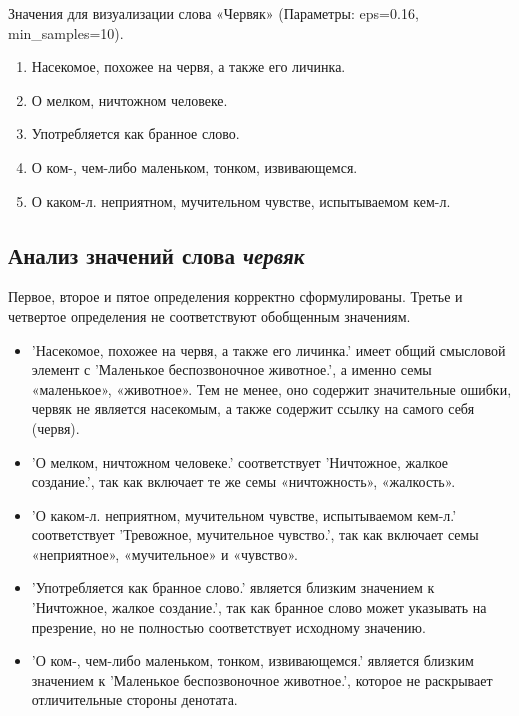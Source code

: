 Значения для визуализации слова «Червяк» (Параметры: eps=0.16, min\_samples=10).

\begin{enumerate}
    \item Насекомое, похожее на червя, а также его личинка.
    \item О мелком, ничтожном человеке.
    \item Употребляется как бранное слово.
    \item О ком-, чем-либо маленьком, тонком, извивающемся.
    \item О каком-л. неприятном, мучительном чувстве, испытываемом кем-л.
\end{enumerate}

\subsection*{Анализ значений слова \textit{червяк}}

Первое, второе и пятое определения корректно сформулированы.
Третье и четвертое определения не соответствуют обобщенным значениям.

\begin{itemize}
    \item ’Насекомое, похожее на червя, а также его личинка.’ имеет общий смысловой элемент с
’Маленькое беспозвоночное животное.’, а именно семы «маленькое», «животное».
Тем не менее, оно содержит значительные ошибки, червяк не является насекомым, а также содержит
ссылку на самого себя (червя).

    \item ’О мелком, ничтожном человеке.’ соответствует
’Ничтожное, жалкое создание.’, так как включает те же семы «ничтожность», «жалкость».

    \item ’О каком-л. неприятном, мучительном чувстве, испытываемом кем-л.’ соответствует
’Тревожное, мучительное чувство.’, так как включает семы «неприятное», «мучительное» и
«чувство».
\end{itemize}

\begin{itemize}
    \item ’Употребляется как бранное слово.’ является близким значением к
’Ничтожное, жалкое создание.’, так как бранное слово может указывать на презрение,
но не полностью соответствует исходному значению.

    \item ’О ком-, чем-либо маленьком, тонком, извивающемся.’ является близким значением к
’Маленькое беспозвоночное животное.’, которое не раскрывает отличительные стороны денотата.
\end{itemize}

